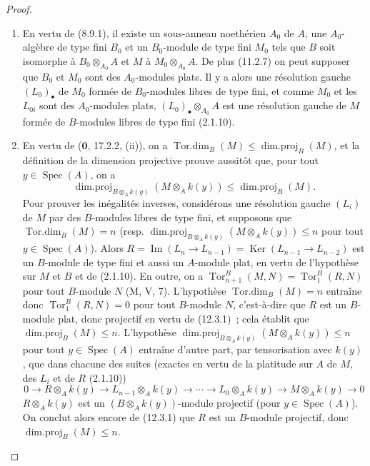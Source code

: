 \begin{proof}
\begin{enumerate}[label=(\roman*)]
  \item En vertu de (8.9.1), il existe un sous-anneau noethérien $A_0$ de $A$,
  une $A_0$-algèbre de type fini $B_0$ et un $B_0$-module de type fini $M_0$
  tels que $B$ soit isomorphe à $B_0\otimes_{A_0}A$ et $M$ à
  $M_0\otimes_{A_0}A$. De plus (11.2.7) on peut supposer que $B_0$ et $M_0$
  sont des $A_0$-modules plats. Il y a alors une résolution gauche
  $(L_0)_\bullet$ de $M_0$ formée de $B_0$-modules libres de type fini, et
  comme $M_0$ et les $L_{0i}$ sont des $A_0$-modules plats,
  $(L_0)_\bullet\otimes_{A_0}A$ est une résolution gauche de $M$ formée de
  $B$-modules libres de type fini (2.1.10).

  \item En vertu de ($\mathbf 0$, 17.2.2, (ii)), on a
  $\operatorname{Tor.dim}_B(M)\leq\operatorname{dim.proj}_B(M)$, et la
  définition de la dimension projective prouve aussitôt que, pour tout
  $y\in\operatorname{Spec}(A)$, on a
  \[
    \operatorname{dim.proj}_{B\otimes_Ak(y)}(M\otimes_Ak(y))
    \leq\operatorname{dim.proj}_B(M).
  \]
  Pour prouver les inégalités inverses, considérons une résolution gauche
  $(L_i)$ de $M$ par des $B$-modules libres de type fini, et supposons que
  $\operatorname{Tor.dim}_B(M)=n$ (resp.
  $\operatorname{dim.proj}_{B\otimes_Ak(y)}(M\otimes_Ak(y))\leq n$ pour tout
  $y\in\operatorname{Spec}(A)$). Alors
  $R=\operatorname{Im}(L_n\to L_{n-1})=\operatorname{Ker}(L_{n-1}\to L_{n-2})$
  est un $B$-module de type fini et aussi un $A$-module plat, en vertu de
  l'hypothèse sur $M$ et $B$ et de (2.1.10). En outre, on a
  $\operatorname{Tor}^B_{n+1}(M,N)=\operatorname{Tor}^B_1(R,N)$ pour tout
  $B$-module $N$ (M, V, 7). L'hypothèse $\operatorname{Tor.dim}_B(M)=n$
  entraîne donc $\operatorname{Tor}^B_1(R,N)=0$ pour tout $B$-module $N$,
  c'est-à-dire que $R$ est un $B$-module plat, donc projectif en vertu de
  (12.3.1)~; cela établit que $\operatorname{dim.proj}_B(M)\leq n$.
  L'hypothèse
  $\operatorname{dim.proj}_{B\otimes_Ak(y)}(M\otimes_Ak(y))\leq n$ pour tout
  $y\in\operatorname{Spec}(A)$ entraîne d'autre part, par tensorisation avec
  $k(y)$, que dans chacune des suites (exactes en vertu de la platitude sur $A$
  de $M$, des $L_i$ et de $R$ (2.1.10))
  \[
    0\to R\otimes_Ak(y)\to L_{n-1}\otimes_Ak(y)\to\cdots
    \to L_0\otimes_Ak(y)\to M\otimes_Ak(y)\to0
  \]
  $R\otimes_Ak(y)$ est un $(B\otimes_Ak(y))$-module projectif (pour
  $y\in\operatorname{Spec}(A)$). On conclut alors encore de (12.3.1) que $R$
  est un $B$-module projectif, donc $\operatorname{dim.proj}_B(M)\leq n$.
\end{enumerate}
\end{proof}


